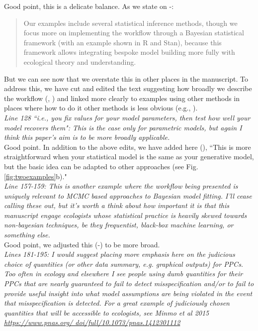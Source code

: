 \documentclass[11pt,a4paper]{article}
\begin{document}
Good point, this is a delicate balance. As we state on -:
\begin{quote}
Our examples include several statistical inference methods, though we focus more on implementing the workflow through a Bayesian statistical framework (with an example shown in \textsf{R} and \textsf{Stan}), because this framework allows integrating bespoke model building more fully with ecological theory and understanding.
\end{quote}
But we can see now that we overstate this in other places in the manuscript. To address this, we have cut and edited the text suggesting how broadly we describe the workflow (, ) and linked more clearly to examples using other methods in places where how to do it other methods is less obvious (e.g., ). \\

\emph{Line 128 ``i.e., you fix values for your model parameters, then test how well your model recovers them": This is the case only for parametric models, but again I think this paper's aim is to be more broadly applicable.}\\

Good point. In addition to the above edits, we have added here (), ``This is more straightforward when your statistical model is the same as your generative model, but the basic idea can be adapted to other approaches (see Fig. \ref{fig:twoexamples}b)."\\

\emph{Line 157-159: This is another example where the workflow being presented is uniquely relevant to MCMC based approaches to Bayesian model fitting. I'll cease calling these out, but it's worth a think about how important it is that this manuscript engage ecologists whose statistical practice is heavily skewed towards non-bayesian techniques, be they frequentist, black-box machine learning, or something else.}\\

Good point, we adjusted this (-) to be more broad.\\

\emph{Lines 181-195: I would suggest placing more emphasis here on the judicious choice of quantities (or other data summary, e.g. graphical outputs) for PPCs. Too often in ecology and elsewhere I see people using dumb quantities for their PPCs that are nearly guaranteed to fail to detect misspecification and/or to fail to provide useful insight into what model assumptions are being violated in the event that misspecification is detected. For a great example of judiciously chosen quantities that will be accessible to ecologists, see Minmo et al 2015 \url{https://www.pnas.org/ doi/full/10.1073/pnas.1412301112}
}\\
\end{document}
